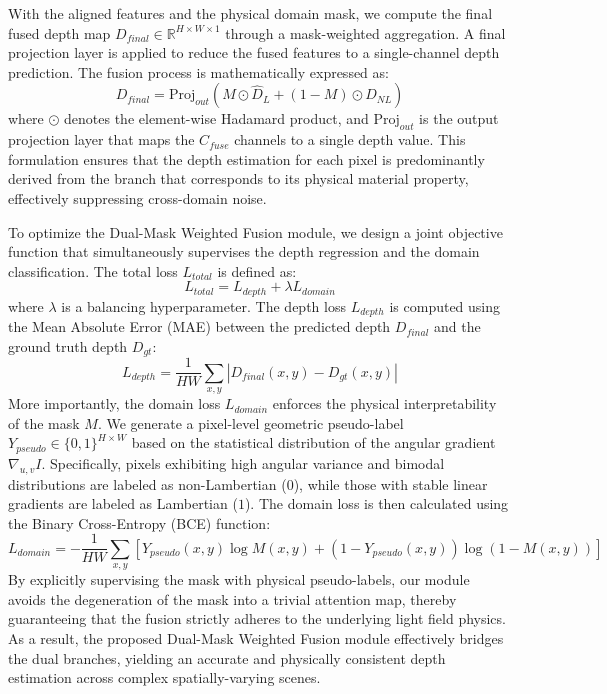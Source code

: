 \documentclass[lettersize,journal]{IEEEtran}
\begin{document}
With the aligned features and the physical domain mask, we compute the final fused depth map $D_{final} \in \mathbb{R}^{H \times W \times 1}$ through a mask-weighted aggregation. A final projection layer is applied to reduce the fused features to a single-channel depth prediction. The fusion process is mathematically expressed as:
\begin{equation}
D_{final} = \text{Proj}_{out} \left( M \odot \hat{D}_L + (1 - M) \odot \hat{D}_{NL} \right)
\label{eq:ch3_19}
\end{equation}
where $\odot$ denotes the element-wise Hadamard product, and $\text{Proj}_{out}$ is the output projection layer that maps the $C_{fuse}$ channels to a single depth value. This formulation ensures that the depth estimation for each pixel is predominantly derived from the branch that corresponds to its physical material property, effectively suppressing cross-domain noise.

To optimize the Dual-Mask Weighted Fusion module, we design a joint objective function that simultaneously supervises the depth regression and the domain classification. The total loss $L_{total}$ is defined as:
\begin{equation}
L_{total} = L_{depth} + \lambda L_{domain}
\label{eq:ch3_20}
\end{equation}
where $\lambda$ is a balancing hyperparameter. The depth loss $L_{depth}$ is computed using the Mean Absolute Error (MAE) between the predicted depth $D_{final}$ and the ground truth depth $D_{gt}$:
\begin{equation}
L_{depth} = \frac{1}{HW} \sum_{x,y} \left| D_{final}(x,y) - D_{gt}(x,y) \right|
\label{eq:ch3_21}
\end{equation}
More importantly, the domain loss $L_{domain}$ enforces the physical interpretability of the mask $M$. We generate a pixel-level geometric pseudo-label $Y_{pseudo} \in \{0, 1\}^{H \times W}$ based on the statistical distribution of the angular gradient $\nabla_{u,v} I$. Specifically, pixels exhibiting high angular variance and bimodal distributions are labeled as non-Lambertian ($0$), while those with stable linear gradients are labeled as Lambertian ($1$). The domain loss is then calculated using the Binary Cross-Entropy (BCE) function:
\begin{equation}
L_{domain} = - \frac{1}{HW} \sum_{x,y} \left[ Y_{pseudo}(x,y) \log M(x,y) + (1 - Y_{pseudo}(x,y)) \log (1 - M(x,y)) \right]
\label{eq:ch3_22}
\end{equation}
By explicitly supervising the mask with physical pseudo-labels, our module avoids the degeneration of the mask into a trivial attention map, thereby guaranteeing that the fusion strictly adheres to the underlying light field physics. As a result, the proposed Dual-Mask Weighted Fusion module effectively bridges the dual branches, yielding an accurate and physically consistent depth estimation across complex spatially-varying scenes.
\end{document}
